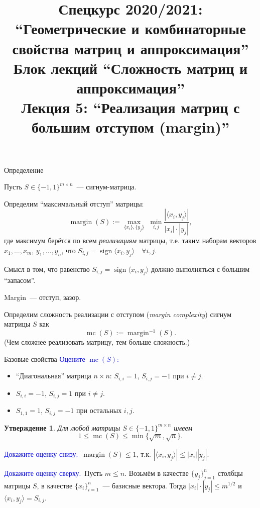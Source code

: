 \documentclass[handout]{beamer}
\title{Спецкурс 2020/2021: ``Геометрические и комбинаторные свойства матриц и
аппроксимация'' \\ Блок лекций ``Сложность матриц и аппроксимация'' \\ Лекция 5:
``Реализация матриц с большим отступом (margin)''}
\renewcommand\le{\leqslant}
\newtheorem*{statement}{Утверждение}
\DeclareMathOperator{\sign}{sign}
\DeclareMathOperator{\margin}{margin}
\DeclareMathOperator{\mc}{mc}
\begin{document}
\maketitle


\begin{frame}{Определение}

    Пусть $S\in\{-1,1\}^{m\times n}$~--- сигнум-матрица.
    \pause

    Определим ``максимальный отступ'' матрицы:
    $$
    \margin(S) := \max_{\{x_i\},\{y_j\}}\; \min_{i,j} \frac{|\langle x_i,y_j\rangle|}{|x_i|\cdot|y_j|},
    $$
    где максимум берётся по всем \textit{реализациям} матрицы, т.е. таким
    наборам векторов $x_1,\ldots,x_m$, $y_1,\ldots,y_n$, что
    $S_{i,j}=\sign\langle x_i,y_j\rangle\quad\forall i,j$.
    \pause

    Смысл в том, что равенство $S_{i,j}=\sign \langle x_i,y_j\rangle$ должно
    выполняться с большим ``запасом''.
    \pause\vspace{5pt}

    Margin~--- отступ, зазор.
    \pause\vspace{5pt}

    Определим сложность реализации с отступом (\textit{margin complexity})
    сигнум матрицы $S$ как
    $$
    \mc(S) := \margin^{-1}(S).
    $$
    \pause
    (Чем сложнее реализовать матрицу, тем больше сложность.)
\end{frame}

\begin{frame}{Базовые свойства}
    \textcolor{blue}{Оцените $\mc(S)$:}\pause
    \begin{itemize}
        \item ``Диагональная'' матрица $n\times n$: $S_{i,i}=1$, $S_{i,j}=-1$ при
            $i\ne j$.\pause
        \item $S_{i,i}=-1$, $S_{i,j}=1$ при $i\ne j$.\pause
        \item $S_{1,1}=1$, $S_{i,j}=-1$ при остальных $i,j$.\pause
    \end{itemize}

    \begin{statement}
        Для любой матрицы $S\in\{-1,1\}^{m\times n}$ имеем
        $$
        1 \le \mc(S) \le \min\{\sqrt{m},\sqrt{n}\}.
        $$
    \end{statement}
    \pause
    \textcolor{blue}{Докажите оценку снизу.}\pause~$\margin(S)\le 1$, т.к.
    $|\langle x_i,y_j\rangle|\le|x_i||y_j|$.
    \pause\vspace{5pt}
    
    \textcolor{blue}{Докажите оценку сверху.}\pause~Пусть $m\le n$. Возьмём в
    качестве $\{y_j\}_{j=1}^n$ столбцы матрицы $S$, в качестве
    $\{x_i\}_{i=1}^n$~--- базисные вектора. Тогда $|x_i|\cdot|y_j|\le m^{1/2}$ и
    $\langle x_i,y_j\rangle = S_{i,j}$.

\end{frame}
\end{document}
